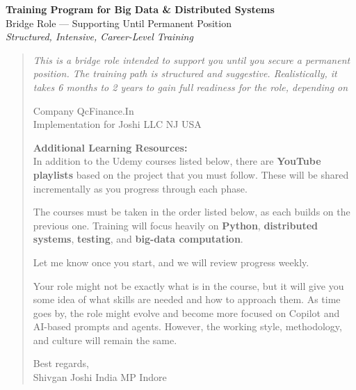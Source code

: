 \documentclass[12pt]{article}
\begin{document}
	
	\begin{center}
		{\Huge\bfseries Training Program for Big Data \& Distributed Systems} \\[0.5cm]
		{\large Bridge Role — Supporting Until Permanent Position} \\[0.3cm]
		{\textit{Structured, Intensive, Career-Level Training}} \\[1cm]
	\end{center}
	
	\begin{quote}
		\emph{This is a bridge role intended to support you until you secure a permanent position. The training path is structured and suggestive. Realistically, it takes 6 months to 2 years to gain full readiness for the role, depending on}
		
		\vspace{0.3cm}
		
		Company QcFinance.In \\
		Implementation for Joshi LLC NJ USA
		
		\vspace{0.3cm}
		
		\textbf{Additional Learning Resources:} \\
		In addition to the Udemy courses listed below, there are \textbf{YouTube playlists} based on the project that you must follow. These will be shared incrementally as you progress through each phase.
		
		\vspace{0.3cm}
		
		The courses must be taken in the order listed below, as each builds on the previous one. Training will focus heavily on \textbf{Python}, \textbf{distributed systems}, \textbf{testing}, and \textbf{big-data computation}.
		
		Let me know once you start, and we will review progress weekly.
		
		Your role might not be exactly what is in the course, but it will give you some idea of what skills are needed and how to approach them. As time goes by, the role might evolve and become more focused on Copilot and AI-based prompts and agents. However, the working style, methodology, and culture will remain the same.
		
		Best regards, \\
		Shivgan Joshi India MP Indore
	\end{quote}
	
	\newpage
	
\end{document}
